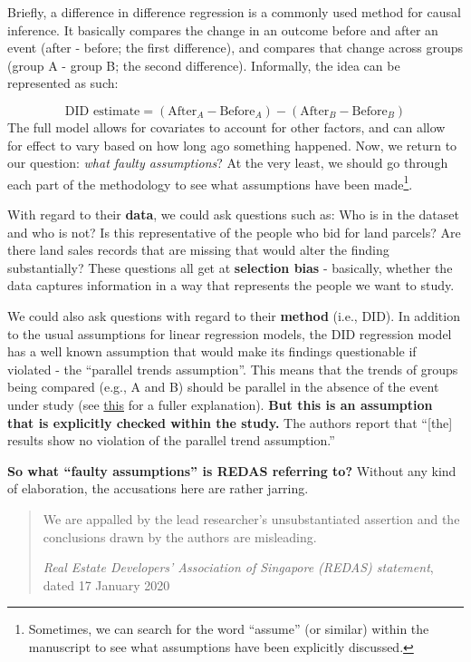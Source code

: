 \documentclass[openany]{book}
\let\rmarkdownfootnote\footnote%
\def\footnote{\protect\rmarkdownfootnote}
\begin{document}
Briefly, a difference in difference regression is a commonly used method
for causal inference. It basically compares the change in an outcome
before and after an event (after - before; the first difference), and
compares that change across groups (group A - group B; the second
difference). Informally, the idea can be represented as such:

\[
\text{DID estimate} = (\text{After}_A-\text{Before}_A) - (\text{After}_B-\text{Before}_B) 
\] The full model allows for covariates to account for other factors,
and can allow for effect to vary based on how long ago something
happened. Now, we return to our question: \emph{what faulty
assumptions}? At the very least, we should go through each part of the
methodology to see what assumptions have been made\footnote{Sometimes,
  we can search for the word ``assume'' (or similar) within the
  manuscript to see what assumptions have been explicitly discussed.}.

With regard to their \textbf{data}, we could ask questions such as: Who
is in the dataset and who is not? Is this representative of the people
who bid for land parcels? Are there land sales records that are missing
that would alter the finding substantially? These questions all get at
\textbf{selection bias} - basically, whether the data captures
information in a way that represents the people we want to study.

We could also ask questions with regard to their \textbf{method} (i.e.,
DID). In addition to the usual assumptions for linear regression models,
the DID regression model has a well known assumption that would make its
findings questionable if violated - the ``parallel trends assumption''.
This means that the trends of groups being compared (e.g., A and B)
should be parallel in the absence of the event under study (see
\href{https://www.mailman.columbia.edu/research/population-health-methods/difference-difference-estimation}{this}
for a fuller explanation). \textbf{But this is an assumption that is
explicitly checked within the study.} The authors report that
``{[}the{]} results show no violation of the parallel trend
assumption.''

\textbf{So what ``faulty assumptions'' is REDAS referring to?} Without
any kind of elaboration, the accusations here are rather jarring.

\begin{quote}
We are appalled by the lead researcher's unsubstantiated assertion and
the conclusions drawn by the authors are misleading.

\emph{Real Estate Developers' Association of Singapore (REDAS)
statement}, dated 17 January 2020
\end{quote}
\end{document}
